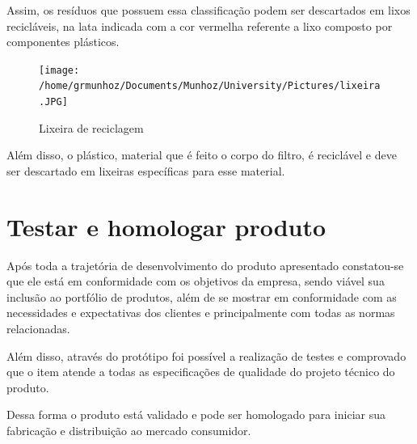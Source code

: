 \documentclass[
	12pt,				%
	openright,			%
	oneside,			%
	a4paper,			%
	english,			%
	french,				%
	spanish,			%
	brazil				%
	]{abntex2}
\begin{document}
Assim, os resíduos que possuem essa classificação podem ser descartados em lixos recicláveis, na lata indicada com a cor vermelha referente a lixo composto por componentes plásticos.

\begin{figure}[H]
\begin{center}
\caption{Lixeira de reciclagem}
\texttt{[image: /home/grmunhoz/Documents/Munhoz/University/Pictures/lixeira.JPG]} 
\label{figetapas}
\end{center}
\end{figure}

Além disso, o plástico, material que é feito o corpo do filtro, é reciclável e deve ser descartado em lixeiras específicas para esse material.

\section{Testar e homologar produto}

Após toda a trajetória de desenvolvimento do produto apresentado constatou-se que ele está em conformidade com os objetivos da empresa, sendo viável sua inclusão ao portfólio de produtos, além de se mostrar em conformidade com as necessidades e expectativas dos clientes e principalmente com todas as normas relacionadas.

Além disso, através do protótipo foi possível a realização de testes e comprovado que o item atende a todas as especificações de qualidade do projeto técnico do produto.

Dessa forma o produto está validado e pode ser homologado para iniciar sua fabricação e distribuição ao mercado consumidor.


\newpage


\postextual






\end{document}
